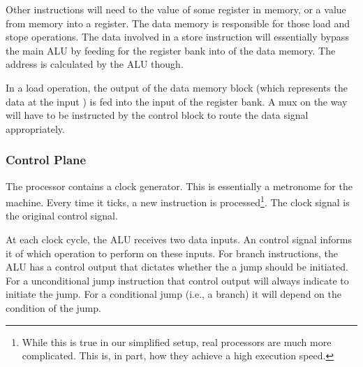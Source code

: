 Other instructions will need to  the value of some register in memory, or  a value from memory into a register. The data memory is responsible for those load and stope operations. The data involved in a store instruction will essentially bypass the main ALU by feeding  for the register bank into  of the data memory. The address is calculated by the ALU though.

In a load operation, the  output of the data memory block (which represents the data at the input ) is fed into the  input of the register bank. A mux on the way will have to be instructed by the control block to route the data signal appropriately.


\subsubsection{Control Plane}
\label{sec:bg:machine:control_plane}

The processor contains a clock generator. This is essentially a metronome for the machine. Every time it ticks, a new instruction is processed\footnote{While this is true in our simplified setup, real processors are much more complicated. This is, in part, how they achieve a high execution speed.}. The clock signal is the original control signal.

At each clock cycle, the ALU receives two data inputs. An  control signal informs it of which operation to perform on these inputs. For branch instructions, the ALU has a control output that dictates whether the a jump should be initiated. For a unconditional jump instruction that control output will always indicate to initiate the jump. For a conditional jump (i.e., a branch) it will depend on the condition of the jump.

